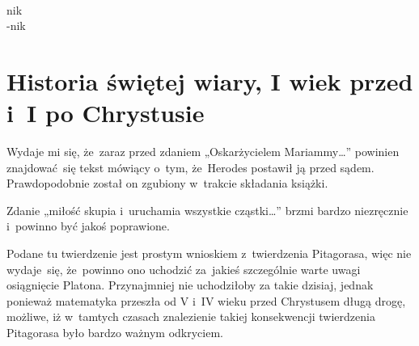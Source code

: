 \documentclass[a4paper,11pt]{article}
\begin{document}
\noindent
{} \\
\Jest \hspace{5pt} nik \\
\Powin -nik \\

\vspace{\spaceTwo}


















\section{Historia świętej wiary, I wiek przed i~I po Chrystusie}

\vspace{\spaceTwo}






\start {} Wydaje mi się, że~zaraz przed zdaniem
„Oskarżycielem Mariammy\ldots” powinien znajdować~się tekst mówiący
o~tym, że~Herodes postawił ją przed sądem. Prawdopodobnie został on
zgubiony w~trakcie składania książki.

\vspace{\spaceFour}


\start {} Zdanie „miłość skupia i~uruchamia wszystkie
cząstki\ldots” brzmi bardzo niezręcznie i~powinno być jakoś
poprawione.

\vspace{\spaceFour}


\start {} Podane tu twierdzenie jest prostym wnioskiem
z~twierdzenia Pitagorasa, więc nie wydaje~się, że~powinno ono uchodzić
za~jakieś szczególnie warte uwagi osiągnięcie Platona. Przynajmniej
nie uchodziłoby za takie dzisiaj, jednak ponieważ matematyka przeszła
od V i~IV wieku przed Chrystusem długą drogę, możliwe, iż w~tamtych
czasach znalezienie takiej konsekwencji twierdzenia Pitagorasa było
bardzo ważnym odkryciem.
\end{document}
